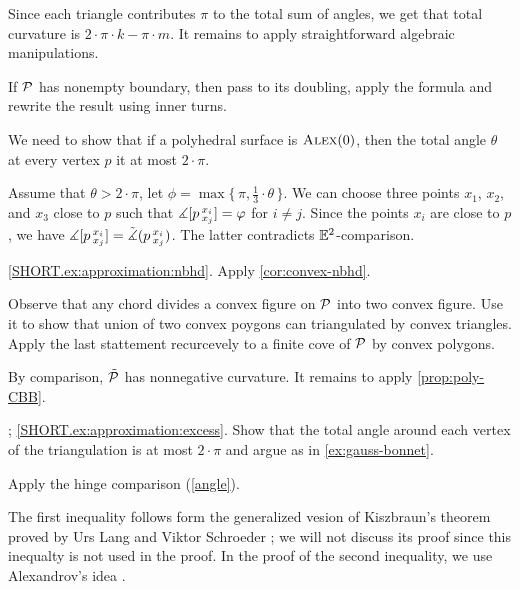 Since each triangle contributes $\pi$ to the total sum of angles, we get that total curvature is $2\cdot\pi\cdot k-\pi\cdot m$.
It remains to apply straightforward algebraic manipulations.

If $\mathcal{P}$ has nonempty boundary, then pass to its doubling, apply the formula and rewrite the result using inner turns.

We need to show that if a polyhedral surface is $\textsc{Alex}(0)$, then the total angle $\theta$ at every vertex $p$ it at most $2\cdot\pi$.

Assume that $\theta>2\cdot\pi$,
let $\phi=\max\{\,\pi,\tfrac13\cdot\theta\,\}$.
We can choose three points $x_1$, $x_2$, and $x_3$ close to $p$ such that
$\measuredangle [p\,{}^{x_i}_{x_j}]=\varphi$ for $i\ne j$.
Since the points $x_i$ are close to $p$, we have $\measuredangle [p\,{}^{x_i}_{x_j}]=\tilde\measuredangle(p\,{}^{x_i}_{x_j})$.
The latter contradicts $\mathbb{E}^2$-comparison.

\ref{SHORT.ex:approximation:nbhd}.
Apply \ref{cor:convex-nbhd}.

Observe that any chord divides a convex figure on $\mathcal{P}$ into two convex figure.
Use it to show that union of two convex poygons can triangulated by convex triangles.
Apply the last stattement recurcevely to a finite cove of $\mathcal{P}$ by convex polygons.

By comparison, $\tilde{\mathcal{P}}$ has nonnegative curvature.
It remains to apply \ref{prop:poly-CBB}.


\parbf{\ref{ex:approximation}}; \ref{SHORT.ex:approximation:excess}.
Show that the total angle around each vertex of the triangulation is at most $2\cdot\pi$ and argue as in \ref{ex:gauss-bonnet}.

Apply the hinge comparison (\ref{angle}).

The first inequality follows form the generalized vesion of Kiszbraun's theorem proved by Urs Lang and Viktor Schroeder \cite{lang-schroeder:kirszbraun, alexander-kapovitch-kirszbraun,alexander-kapovitch-petrunin2024};
we will not discuss its proof since this inequalty is not used in the proof.
In the proof of the second inequality, we use Alexandrov's idea \cite[X §~1]{alexandrov-1948}.

